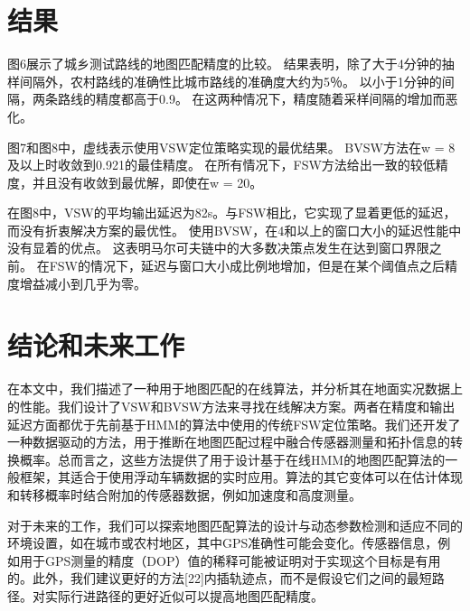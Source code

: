 \section{结果}

图6展示了城乡测试路线的地图匹配精度的比较。 结果表明，除了大于4分钟的抽样间隔外，农村路线的准确性比城市路线的准确度大约为5％。 以小于1分钟的间隔，两条路线的精度都高于0.9。 在这两种情况下，精度随着采样间隔的增加而恶化。

图7和图8中，虚线表示使用VSW定位策略实现的最优结果。 BVSW方法在w = 8及以上时收敛到0.921的最佳精度。 在所有情况下，FSW方法给出一致的较低精度，并且没有收敛到最优解，即使在w = 20。

在图8中，VSW的平均输出延迟为82s。与FSW相比，它实现了显着更低的延迟，而没有折衷解决方案的最优性。 使用BVSW，在4和以上的窗口大小的延迟性能中没有显着的优点。 这表明马尔可夫链中的大多数决策点发生在达到窗口界限之前。 在FSW的情况下，延迟与窗口大小成比例地增加，但是在某个阈值点之后精度增益减小到几乎为零。




\section{结论和未来工作}

在本文中，我们描述了一种用于地图匹配的在线算法，并分析其在地面实况数据上的性能。我们设计了VSW和BVSW方法来寻找在线解决方案。两者在精度和输出延迟方面都优于先前基于HMM的算法中使用的传统FSW定位策略。我们还开发了一种数据驱动的方法，用于推断在地图匹配过程中融合传感器测量和拓扑信息的转换概率。总而言之，这些方法提供了用于设计基于在线HMM的地图匹配算法的一般框架，其适合于使用浮动车辆数据的实时应用。算法的其它变体可以在估计体现和转移概率时结合附加的传感器数据，例如加速度和高度测量。

对于未来的工作，我们可以探索地图匹配算法的设计与动态参数检测和适应不同的环境设置，如在城市或农村地区，其中GPS准确性可能会变化。传感器信息，例如用于GPS测量的精度（DOP）值的稀释可能被证明对于实现这个目标是有用的。此外，我们建议更好的方法[22]内插轨迹点，而不是假设它们之间的最短路径。对实际行进路径的更好近似可以提高地图匹配精度。